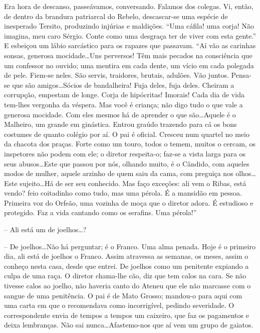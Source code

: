 Era hora de descanso, passeávamos, conversando. Falamos dos
colegas. Vi, então, de dentro da brandura patriarcal do Rebelo,
descascar{}-se uma espécie de inesperado Tersito, produzindo injúrias e
maldições. ``Uma cáfila! uma corja! Não imagina, meu caro Sérgio. Conte
como uma desgraça ter de viver com esta gente.'' E esbeiçou um lábio
sarcástico para os rapazes que passavam. ``Aí vão as carinhas sonsas,
generosa mocidade\ldots Uns perversos! Têm mais pecados na consciência que
um confessor no ouvido; uma mentira em cada dente, um vício em cada
polegada de pele. Fiem{}-se neles. São servis, traidores, brutais,
adulões. Vão juntos. Pensa{}-se que são amigos\ldots Sócios de
bandalheira! Fuja deles, fuja deles. Cheiram a corrupção, empestam de longe. 
Corja de hipócritas! Imorais! Cada dia de vida tem{}-lhes vergonha da véspera.
Mas você é criança; não digo tudo o que vale a generosa mocidade. Com
eles mesmos há de aprender o que são\ldots Aquele é o Malheiro, um grande
em ginástica. Entrou graúdo trazendo para cá os bons costumes de quanto
colégio por aí. O pai é oficial. Cresceu num quartel no meio da chacota
dos praças. Forte como um touro, todos o temem, muitos o cercam, os
inspetores não podem com ele; o diretor respeita{}-o; faz{}-se a vista
larga para os seus abusos\ldots Este que passou por nós, olhando muito, é
o Cândido, com aqueles modos de mulher, aquele arzinho de quem saiu da
cama, com preguiça nos olhos\ldots Este sujeito\ldots Há de ser seu
conhecido. Mas faço exceções: ali vem o Ribas, está vendo? feio
coitadinho como tudo, mas uma pérola. É a mansidão em pessoa. Primeira
voz do Orfeão, uma vozinha de moça que o diretor adora. É estudioso e
protegido. Faz a vida cantando como os serafins. Uma pérola!'' 

-- Ali está um de joelhos\ldots? 

-- De joelhos\ldots Não há perguntar; é o Franco.
Uma alma penada. Hoje é o primeiro dia, ali está de joelhos o Franco.
Assim atravessa as semanas, os meses, assim o conheço nesta casa, desde
que entrei. De joelhos como um penitente expiando a culpa de uma raça.
O diretor chama{}-lhe cão, diz que tem calos na cara. Se não tivesse
calos ao joelho, não haveria canto do Ateneu que ele não marcasse com o
sangue de uma penitência. O pai é de Mato Grosso; mandou{}-o para aqui
com uma carta em que o recomendava como incorrigível, pedindo
severidade. O correspondente envia de tempos a tempos um caixeiro, que
faz os pagamentos e deixa lembranças. Não sai nunca\ldots Afastemo{}-nos
que aí vem um grupo de gaiatos. 

